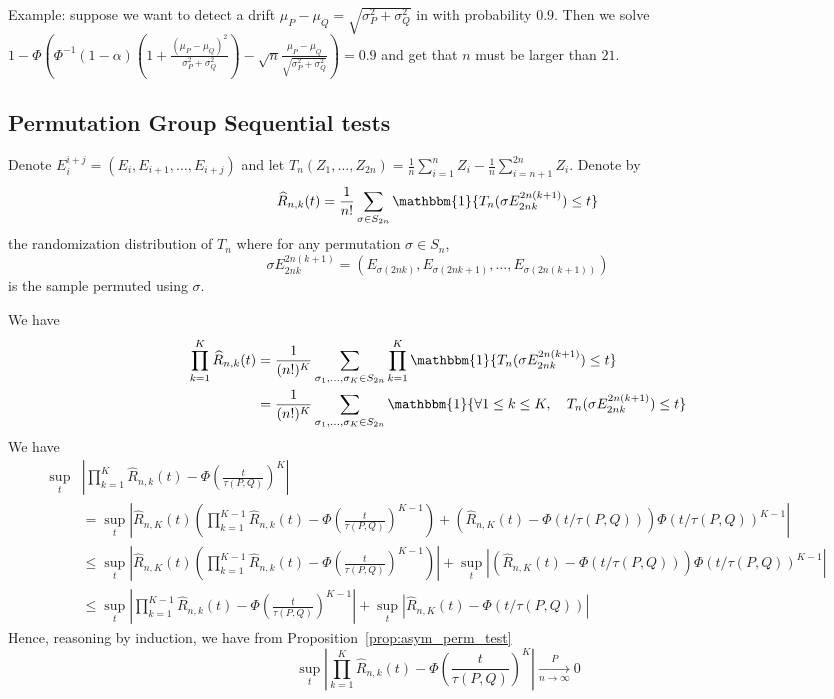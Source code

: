 \documentclass{article}
\theoremstyle{plain}
\theoremstyle{remark}
\newcommand{\1}{\mathbbm{1}}
\numberwithin{equation}{section}
\begin{document}
Example: suppose we want to detect a drift $\mu_P-\mu_Q=\sqrt{\sigma_P^2+\sigma_Q^2}$ in with probability $0.9$. Then we solve $1-\Phi\left(\Phi^{-1}(1-\alpha)\left(1+\frac{(\mu_P-\mu_Q)^2}{\sigma_P^2+\sigma_Q^2 }\right)-  \sqrt{n}\frac{\mu_P-\mu_Q}{\sqrt{\sigma_P^2+\sigma_Q^2}} \right) = 0.9$ and get that $n$ must be larger than $21$.

\subsection{Permutation Group Sequential tests}



Denote $E_{i}^{i+j}=(E_i, E_{i+1},\dots, E_{i+j})$ and let $T_n(Z_1,\dots,Z_{2n})=\frac{1}{n}\sum_{i=1}^n Z_i -\frac{1}{n}\sum_{i=n+1}^{2n} Z_i$. Denote by 
$$\widehat{R}_{n,k}(t)=\frac{1}{n!}\sum_{\sigma \in S_{2n}} \1\{T_n(\sigma E_{2nk}^{2n(k+1)}) \le t\} $$
the randomization distribution of $T_n$ where for any permutation $\sigma \in S_n$, 
$$\sigma E_{2nk}^{2n(k+1)}=(E_{\sigma(2nk)},E_{\sigma(2nk+1)},\dots,E_{\sigma(2n(k+1))})$$
is the sample permuted using $ \sigma$. 


We have 
\begin{align*}
\prod_{k=1}^K \widehat{R}_{n,k}(t) &=\frac{1}{(n!)^K}\sum_{\sigma_1,\dots,\sigma_K \in S_{2n}} \prod_{k=1}^K \1\{T_n(\sigma E_{2nk}^{2n(k+1)}) \le t\} \\
&=\frac{1}{(n!)^K}\sum_{\sigma_1,\dots,\sigma_K \in S_{2n}}  \1\{ \forall 1\le k\le K, \quad T_n(\sigma E_{2nk}^{2n(k+1)}) \le t\}
\end{align*}
We have
\begin{align*}
\sup_{t}&\left|\prod_{k=1}^K \widehat{R}_{n,k}(t) - \Phi\left( \frac{t}{\tau(P,Q)}\right)^{K} \right| \\
&= \sup_t \left| \widehat{R}_{n,K}(t)\left(\prod_{k=1}^{K-1} \widehat{R}_{n,k}(t) - \Phi\left( \frac{t}{\tau(P,Q)}\right)^{K-1}\right) + (\widehat{R}_{n,K}(t)-\Phi(t/\tau(P,Q))) \Phi(t/\tau(P,Q))^{K-1} \right|\\
&\le \sup_t \left| \widehat{R}_{n,K}(t)\left(\prod_{k=1}^{K-1} \widehat{R}_{n,k}(t) - \Phi\left( \frac{t}{\tau(P,Q)}\right)^{K-1}\right)\right| + \sup_t\left|(\widehat{R}_{n,K}(t)-\Phi(t/\tau(P,Q))) \Phi(t/\tau(P,Q))^{K-1} \right|\\
&\le \sup_t \left|\prod_{k=1}^{K-1} \widehat{R}_{n,k}(t) - \Phi\left( \frac{t}{\tau(P,Q)}\right)^{K-1}\right| + \sup_t\left|\widehat{R}_{n,K}(t)-\Phi(t/\tau(P,Q)) \right|
\end{align*}
Hence, reasoning by induction, we have from Proposition~\ref{prop:asym_perm_test}
$$\sup_{t}\left|\prod_{k=1}^K \widehat{R}_{n,k}(t) - \Phi\left( \frac{t}{\tau(P,Q)}\right)^{K} \right|\xrightarrow[n \to \infty]{P} 0$$
\end{document}
